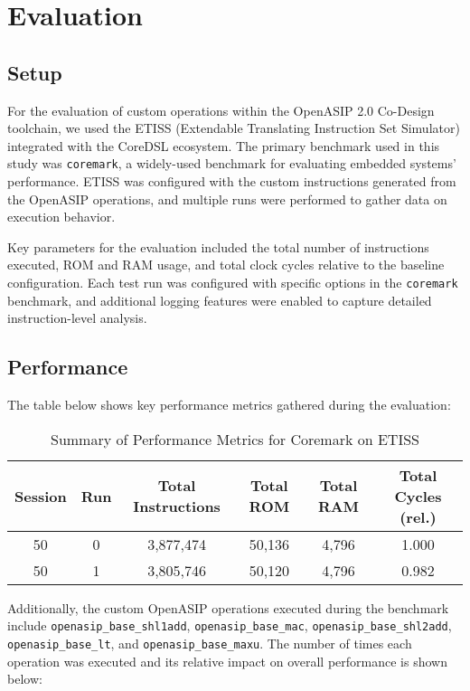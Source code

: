 \section{Evaluation}

\subsection{Setup}

For the evaluation of custom operations within the OpenASIP 2.0 Co-Design toolchain, we used the ETISS (Extendable Translating Instruction Set Simulator) integrated with the CoreDSL ecosystem. The primary benchmark used in this study was \texttt{coremark}, a widely-used benchmark for evaluating embedded systems' performance. ETISS was configured with the custom instructions generated from the OpenASIP operations, and multiple runs were performed to gather data on execution behavior.

Key parameters for the evaluation included the total number of instructions executed, ROM and RAM usage, and total clock cycles relative to the baseline configuration. Each test run was configured with specific options in the \texttt{coremark} benchmark, and additional logging features were enabled to capture detailed instruction-level analysis.

\subsection{Performance}

The table below shows key performance metrics gathered during the evaluation:

\begin{table}[h!]
    \centering
    \begin{tabular}{|c|c|c|c|c|c|}
        \hline
        \textbf{Session} & \textbf{Run} & \textbf{Total Instructions} & \textbf{Total ROM} & \textbf{Total RAM} & \textbf{Total Cycles (rel.)} \\
        \hline
        50  & 0 & 3,877,474 & 50,136 & 4,796 & 1.000 \\
        50  & 1 & 3,805,746 & 50,120 & 4,796 & 0.982 \\
        \hline
    \end{tabular}
    \caption{Summary of Performance Metrics for Coremark on ETISS}
\end{table}

Additionally, the custom OpenASIP operations executed during the benchmark include \texttt{openasip\_base\_shl1add}, \texttt{openasip\_base\_mac}, \texttt{openasip\_base\_shl2add}, \texttt{openasip\_base\_lt}, and \texttt{openasip\_base\_maxu}. The number of times each operation was executed and its relative impact on overall performance is shown below:

